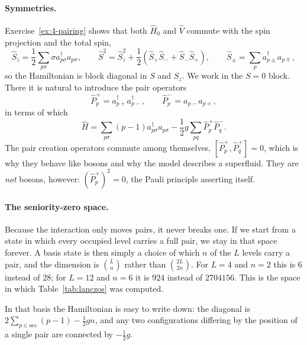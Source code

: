 \paragraph{Symmetries.}
Exercise~\ref{ex:4-pairing} shows that both $\hat{H}_0$ and $\hat{V}$ commute
with the spin projection and the total spin,
\begin{equation}
  \hat{S}_z = \frac{1}{2}\sum_{p\sigma}\sigma
    a^{\dagger}_{p\sigma}a_{p\sigma},
  \qquad
  \hat{S}^2 = \hat{S}_z^2
    + \frac{1}{2}\left(\hat{S}_+\hat{S}_- + \hat{S}_-\hat{S}_+\right),
  \qquad
  \hat{S}_{\pm} = \sum_p a^{\dagger}_{p\pm}a_{p\mp},
  \label{eq:4-pairingspin}
\end{equation}
so the Hamiltonian is block diagonal in $S$ and $S_z$.  We work in the
$S=0$ block.  There it is natural to introduce the pair operators
\begin{equation}
  \hat{P}^{+}_p = a^{\dagger}_{p+}a^{\dagger}_{p-},
  \qquad
  \hat{P}^{-}_p = a_{p-}a_{p+},
  \label{eq:4-pairoperators}
\end{equation}
in terms of which
\begin{equation}
  \hat{H} = \sum_{p\sigma}(p-1)a_{p\sigma}^{\dagger}a_{p\sigma}
    - \frac{1}{2}g\sum_{pq}\hat{P}^{+}_p\hat{P}^{-}_q .
  \label{eq:4-pairingpairform}
\end{equation}
The pair creation operators commute among themselves, $[\hat{P}^{+}_p,
\hat{P}^{+}_q]=0$, which is why they behave like bosons and why the model
describes a superfluid.  They are \emph{not} bosons, however:
$(\hat{P}^{+}_p)^2=0$, the Pauli principle asserting itself.

\paragraph{The seniority-zero space.}
Because the interaction only moves pairs, it never breaks one.  If we start
from a state in which every occupied level carries a full pair, we stay in
that space forever.  A basis state is then simply a choice of which $n$ of the
$L$ levels carry a pair, and the dimension is $\binom{L}{n}$ rather than
$\binom{2L}{2n}$.  For $L=4$ and $n=2$ this is $6$ instead of $28$; for $L=12$
and $n=6$ it is $924$ instead of $2704156$.  This is the space in which
Table~\ref{tab:lanczos} was computed.

In that basis the Hamiltonian is easy to write down: the diagonal is
$2\sum_{p\in\mathrm{occ}}(p-1) - \tfrac{1}{2}gn$, and any two configurations
differing by the position of a single pair are connected by $-\tfrac{1}{2}g$.

